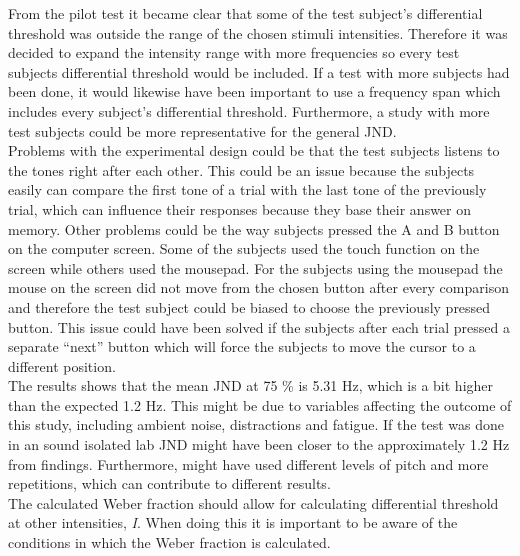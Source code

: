 From the pilot test it became clear that some of the test subject’s differential threshold was outside the range of the chosen stimuli intensities. Therefore it was decided to expand the intensity range with more frequencies so every test subjects differential threshold would be included. If a test with more subjects had been done, it would likewise have been important to use a frequency span which includes every subject’s differential threshold. Furthermore, a study with more test subjects could be more representative for the general JND.\\[5mm] 
%
Problems with the experimental design could be that the test subjects listens to the tones right after each other. This could be an issue because the subjects easily can compare the first tone of a trial with the last tone of the previously trial, which can influence their responses because they base their answer on memory. Other problems could be the way subjects pressed the A and B button on the computer screen. Some of the subjects used the touch function on the screen while others used the mousepad. For the subjects using the mousepad the mouse on the screen did not move from the chosen button after every comparison and therefore the test subject could be biased to choose the previously pressed button. This issue could have been solved if the subjects after each trial pressed a separate “next” button which will force the subjects to move the cursor to a different position.\\[5mm]
%  
The results shows that the mean JND at 75 \% is 5.31 Hz, which is a bit higher than the expected 1.2 Hz. This might be due to variables affecting the outcome of this study, including ambient noise, distractions and fatigue. If the test was done in an sound isolated lab JND might have been closer to the approximately 1.2 Hz from \citep{Wier1977} findings. Furthermore, \citep{Wier1977} might have used different levels of pitch and more repetitions, which can contribute to different results.\\[5mm] 
%
The calculated Weber fraction should allow for calculating differential threshold at other intensities, \textit{I}. When doing this it is important to be aware of the conditions in which the Weber fraction is calculated. 





 
